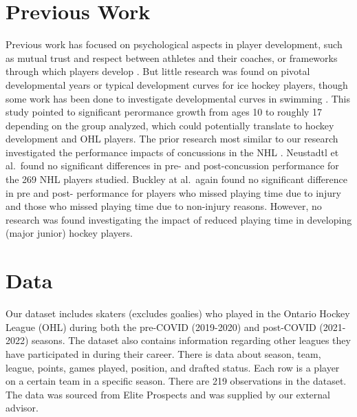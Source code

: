 \documentclass[12pt]{article}
\begin{document}
\hypertarget{previous-work}{%
\section{Previous Work}\label{previous-work}}

Previous work has focused on psychological aspects in player
development, such as mutual trust and respect between athletes and their
coaches, or frameworks through which players develop
\cite{lefebvre, soberlak}. But little research was found on pivotal
developmental years or typical development curves for ice hockey
players, though some work has been done to investigate developmental
curves in swimming \citet{born}. This study pointed to significant
perormance growth from ages 10 to roughly 17 depending on the group
analyzed, which could potentially translate to hockey development and
OHL players. The prior research most similar to our research
investigated the performance impacts of concussions in the NHL
\cite{buckley, neustadtl}. Neustadtl et al.~found no significant
differences in pre- and post-concussion performance for the 269 NHL
players studied. Buckley at al.~again found no significant difference in
pre and post- performance for players who missed playing time due to
injury and those who missed playing time due to non-injury reasons.
However, no research was found investigating the impact of reduced
playing time in developing (major junior) hockey players.

\hypertarget{data}{%
\section{Data}\label{data}}

Our dataset includes skaters (excludes goalies) who played in the
Ontario Hockey League (OHL) during both the pre-COVID (2019-2020) and
post-COVID (2021-2022) seasons. The dataset also contains information
regarding other leagues they have participated in during their career.
There is data about season, team, league, points, games played,
position, and drafted status. Each row is a player on a certain team in
a specific season. There are 219 observations in the dataset. The data
was sourced from Elite Prospects and was supplied by our external
advisor.

\begin{table}

\caption{\label{tab:sample-rows}Sample data rows and variables}
\centering
{}
\end{table}
\end{document}
